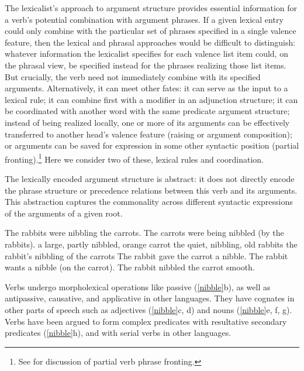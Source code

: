 \documentclass[output=paper,biblatex,babelshorthands,newtxmath,draftmode,colorlinks, citecolor=brown]{langscibook}
\begin{document}
The lexicalist’s approach to argument structure provides essential information for a verb's potential
combination with argument phrases.   If a given lexical entry could only  combine with the particular set of phrases specified in a single valence feature, then the lexical and phrasal approaches would be difficult to distinguish: whatever information the lexicalist specifies for each valence list item could, on the phrasal view, be specified instead for the phrases realizing those list items.  
But crucially, the verb need not immediately combine with its specified
arguments.  Alternatively, it can meet other fates: it can serve as the input to a lexical rule; it
can combine first with a modifier in an adjunction structure; it can be coordinated with another
word with the same predicate argument structure; instead of being realized locally, one or more of
its arguments can be effectively transferred to another head’s valence feature (raising or argument
composition); or arguments can be saved for expression in some other syntactic position (partial
fronting).\footnote{
See  for discussion of partial verb phrase fronting.
} Here we consider two of these, lexical rules and coordination.  
 
\largerpage[1.3]
The lexically encoded argument structure is abstract: it does not directly encode the phrase structure or
precedence relations between this verb and its arguments. This abstraction captures the commonality
across different syntactic expressions of the arguments of a given root.

\begin{exe}
\ex \label{nibble}
\begin{xlist}
\ex  The rabbits were nibbling the carrots.  
\ex  The carrots were being nibbled (by the rabbits).
\ex  a large, partly nibbled, orange carrot 
\ex  the quiet, nibbling, old rabbits
\ex  the rabbit's nibbling of the carrots
\ex  The rabbit gave the carrot a nibble.  
\ex  The rabbit wants a nibble (on the carrot).  
\ex  The rabbit nibbled the carrot smooth.
\end{xlist}
\end{exe}

\noindent
Verbs undergo  morpholexical operations like passive
(\ref{nibble}b), as well as antipassive, causative, and applicative in other languages.  They have cognates in
other parts of speech such as adjectives  (\ref{nibble}c, d) and nouns  (\ref{nibble}e, f, g).  
Verbs have been argued to form complex predicates with resultative secondary predicates (\ref{nibble}h), and with serial verbs in other languages.   
\end{document}
